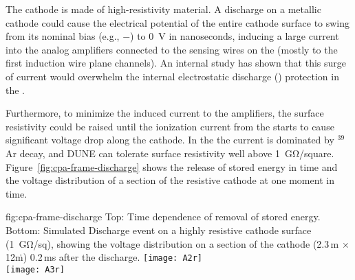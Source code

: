 The cathode is made of high-resistivity material. A  discharge 
on a metallic cathode could cause the electrical potential of the entire cathode surface to swing from its nominal bias (e.g., $-$\sptargetdriftvoltpos) to \SI{0}{V} in nanoseconds, inducing a large current into the analog  amplifiers connected to the sensing wires on the  (mostly to the first induction wire plane channels). An internal study\cite{bib:docdb1320} has shown that this surge of current would overwhelm the internal electrostatic discharge () protection in the  .  

Furthermore, to minimize the induced current to the amplifiers, the surface resistivity could be raised until the ionization current from the  starts to cause significant voltage drop along the cathode.  In the  the current is dominated by $^{39}$Ar decay, and DUNE can tolerate surface resistivity well above \SI{1}{\giga\ohm/square}. Figure~\ref{fig:cpa-frame-discharge} shows the release of stored energy in time and the voltage distribution of a section of the resistive cathode at one moment in time. 

\begin{dunefigure}
{fig:cpa-frame-discharge}
{Top: Time dependence of removal of stored energy. Bottom: Simulated  Discharge event on a highly resistive cathode surface (\SI{1}{\giga\ohm/sq}), showing the voltage distribution on a section of the cathode (2.3\,m $\times$ 12\.m) 0.2\,ms after the discharge. }
\centering
\texttt{[image: A2r]} \\ \vspace{20pt}    %
\texttt{[image: A3r]}
\end{dunefigure}



